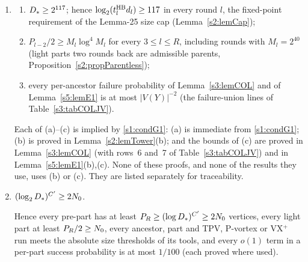 \begin{condition}
\begin{enumerate}
Every round $r\le R$ of the hierarchy has average degree $d_r\ge\Dstar$
(Definition~\ref{s2:defHBtp}), so $\lambda_r\defeq\log_2d_r$ satisfies
$\log_2\lambda_r\ge\log_2\log_2\Dstar$, and (a)--(f) hold at
$\mu=\log_2\lambda_r$. They also hold at $\mu=\log_2\log_2d$ for every
$d\ge\Dstar$, and at $\mu=\log_2\Dstar$ (as $t\ge\log_2t$ for $t>0$). By (a) at
$\mu=\log_2\log_2\Dstar$, $\log_2\Dstar\ge2^{256}$. The consequences used later,
each proved where it is used, are: every requirement (column~2) and every
column-3 inequality of the COL-JV table (Lemma~\ref{s3:lemCOLJV}(ii)); the tower
facts of Proposition~\ref{s2:propDegRec}, Lemma~\ref{s2:lemLacunary} and
Lemma~\ref{s2:lemTower} (among them $\thGC_r>\tau_r$ and
$\lambda_r\ge2^{2\logs d_r+2}$); and Proposition~\ref{s2:propStructure} and
elementary estimates in Sections~\ref{s5:sec}--\ref{s7:sec}, each of which cites
the item it uses.

\item[\Gc{2}]
\begin{enumerate}
\item[(a)] $D_{*}\ge2^{117}$; hence $\log_2(t^{\mathrm{HB}}_ld_l)\ge117$ in every round
$l$, the fixed-point requirement of the Lemma-25 size cap
(Lemma~\ref{s2:lemCap});
\item[(b)] $P_{l-2}/2\ge M_l\log^4M_l$ for every $3\le l\le R$, including rounds
with $M_l=2^{40}$ (light parts two rounds back are admissible parents,
Proposition~\ref{s2:propParentless});
\item[(c)] every per-ancestor failure probability of Lemma~\ref{s3:lemCOL} and
of Lemma~\ref{s5:lemE1} is at most $|V(Y)|^{-2}$ (the failure-union lines of
Table~\ref{s3:tabCOLJV}).
\end{enumerate}
Each of (a)--(c) is implied by \ref{s1:condG1}: (a) is
immediate from \ref{s1:condG1}; (b) is proved in Lemma~\ref{s2:lemTower}(b); and
the bounds of (c) are proved in Lemma~\ref{s3:lemCOL} (with rows~6 and~7 of
Table~\ref{s3:tabCOLJV}) and in Lemma~\ref{s5:lemE1}(b),(c). None of these
proofs, and none of the results they use, uses (b) or (c). They are listed separately for traceability.

\item[\Gc{3}] $(\log_2D_{*})^{C'}\ge2N_{0}$.

Hence every pre-part has at least $P_R\ge(\log D_{*})^{C'}\ge2N_{0}$ vertices,
every light part at least $P_R/2\ge N_{0}$, every ancestor, part and TPV,
P-vortex or VX$^+$ run meets the absolute size thresholds of its tools, and every
$o(1)$ term in a per-part success probability is at most $1/100$ (each proved
where used).


\end{enumerate}
\end{condition}

